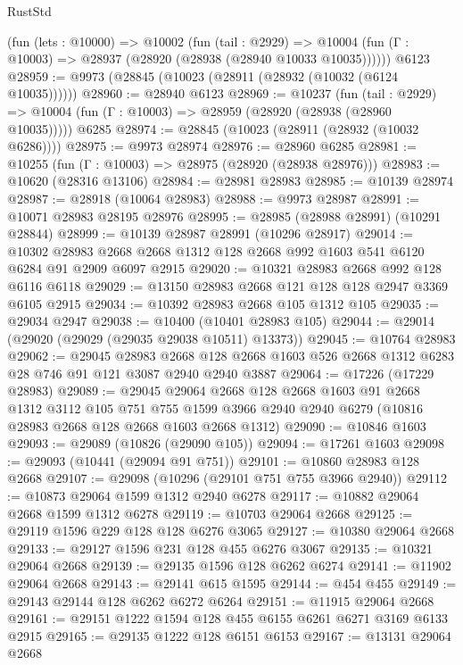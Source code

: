 \begin{lexlean}{RustStd}
\begin{coremodule}
    (fun (lets : @10000) =>
    @10002
      (fun (tail : @2929) =>
      @10004 (fun (Γ : @10003) => @28937 (@28920 (@28938 (@28940 @10033 @10035))))))
    @6123
@28959 := @9973 (@28845 (@10023 (@28911 (@28932 (@10032 (@6124 @10035))))))
@28960 := @28940 @6123
@28969 := @10237
    (fun (tail : @2929) => @10004 (fun (Γ : @10003) => @28959 (@28920 (@28938 (@28960 @10035)))))
    @6285
@28974 := @28845 (@10023 (@28911 (@28932 (@10032 @6286))))
@28975 := @9973 @28974
@28976 := @28960 @6285
@28981 := @10255 (fun (Γ : @10003) => @28975 (@28920 (@28938 @28976)))
@28983 := @10620 (@28316 @13106)
@28984 := @28981 @28983
@28985 := @10139 @28974
@28987 := @28918 (@10064 @28983)
@28988 := @9973 @28987
@28991 := @10071 @28983 @28195 @28976
@28995 := @28985 (@28988 @28991) (@10291 @28844)
@28999 := @10139 @28987 @28991 (@10296 @28917)
@29014 := @10302
    @28983
    @2668
    @2668
    @1312
    @128
    @2668
    @992
    @1603
    @541
    @6120
    @6284
    @91
    @2909
    @6097
    @2915
@29020 := @10321 @28983 @2668 @992 @128 @6116 @6118
@29029 := @13150 @28983 @2668 @121 @128 @128 @2947 @3369 @6105 @2915
@29034 := @10392 @28983 @2668 @105 @1312 @105
@29035 := @29034 @2947
@29038 := @10400 (@10401 @28983 @105)
@29044 := @29014 (@29020 (@29029 (@29035 @29038 @10511) @13373))
@29045 := @10764 @28983
@29062 := @29045
    @28983
    @2668
    @128
    @2668
    @1603
    @526
    @2668
    @1312
    @6283
    @28
    @746
    @91
    @121
    @3087
    @2940
    @2940
    @3887
@29064 := @17226 (@17229 @28983)
@29089 := @29045
    @29064
    @2668
    @128
    @2668
    @1603
    @91
    @2668
    @1312
    @3112
    @105
    @751
    @755
    @1599
    @3966
    @2940
    @2940
    @6279
    (@10816 @28983 @2668 @128 @2668 @1603 @2668 @1312)
@29090 := @10846 @1603
@29093 := @29089 (@10826 (@29090 @105))
@29094 := @17261 @1603
@29098 := @29093 (@10441 (@29094 @91 @751))
@29101 := @10860 @28983 @128 @2668
@29107 := @29098 (@10296 (@29101 @751 @755 @3966 @2940))
@29112 := @10873 @29064 @1599 @1312 @2940 @6278
@29117 := @10882 @29064 @2668 @1599 @1312 @6278
@29119 := @10703 @29064 @2668
@29125 := @29119 @1596 @229 @128 @128 @6276 @3065
@29127 := @10380 @29064 @2668
@29133 := @29127 @1596 @231 @128 @455 @6276 @3067
@29135 := @10321 @29064 @2668
@29139 := @29135 @1596 @128 @6262 @6274
@29141 := @11902 @29064 @2668
@29143 := @29141 @615 @1595
@29144 := @454 @455
@29149 := @29143 @29144 @128 @6262 @6272 @6264
@29151 := @11915 @29064 @2668
@29161 := @29151 @1222 @1594 @128 @455 @6155 @6261 @6271 @3169 @6133 @2915
@29165 := @29135 @1222 @128 @6151 @6153
@29167 := @13131 @29064 @2668

\end{coremodule}
\end{lexlean}
